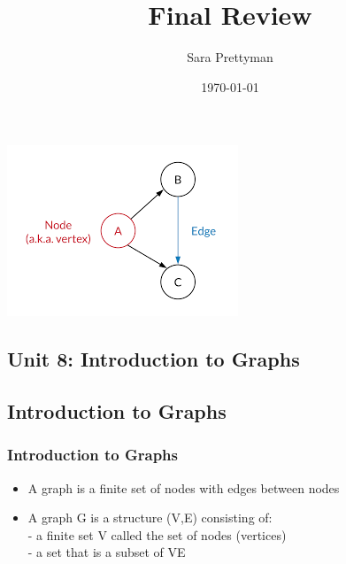 \documentclass[10pt]{article}
\title{Final Review}
\author{Sara Prettyman}
\date{\today}
\begin{document}
\maketitle
\begin{center}
    \includegraphics{review.png}
\end{center}
\tableofcontents
\newpage


\begin{center}
    \section{Unit 8: Introduction to Graphs}
\end{center}

\subsection{Introduction to Graphs}
\subsubsection{Introduction to Graphs}
\begin{itemize}
    \item A graph is a finite set of nodes with edges between nodes
    \item A graph G is a structure (V,E) consisting of:\\
          \indent- a finite set V called the set of nodes (vertices)\\
          \indent- a set that is a subset of VE
\end{itemize}
\end{document}
